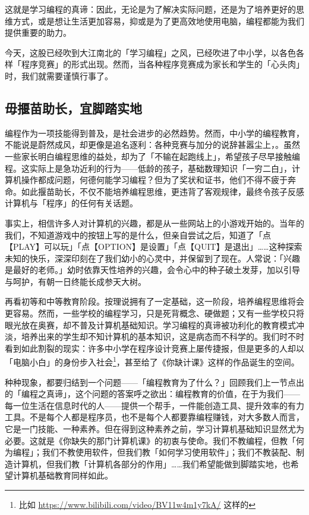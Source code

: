 这就是学习编程的真谛：因此，无论是为了解决实际问题，还是为了培养更好的思维方式，或是想让生活更加容易，抑或是为了更高效地使用电脑，编程都能为我们提供重要的助力。

今天，这股已经吹到大江南北的「学习编程」之风，已经吹进了中小学，以各色各样「程序竞赛」的形式出现。然而，当各种程序竞赛成为家长和学生的「心头肉」时，我们就需要谨慎行事了。

\subsection{毋揠苗助长，宜脚踏实地}

编程作为一项技能得到普及，是社会进步的必然趋势。然而，中小学的编程教育，不能说是蔚然成风，却更像是追名逐利：各种竞赛与加分的说辞甚嚣尘上，。虽然一些家长明白编程思维的益处，却为了「不输在起跑线上」，希望孩子尽早接触编程。这实际上是急功近利的行为——低龄的孩子，基础数理知识「一穷二白」，计算机操作都成问题，何德何能学习编程？但为了奖状和证书，他们不得不疲于奔命。如此揠苗助长，不仅不能培养编程思维，更违背了客观规律，最终令孩子反感计算机与「程序」的任何有关话题。

事实上，相信许多人对计算机的兴趣，都是从一些网站上的小游戏开始的。当年的我们，不知道游戏中的按钮上写的是什么，但亲自尝试之后，知道了「点【PLAY】可以玩」「点【OPTION】是设置」「点【QUIT】是退出」……这种探索未知的快乐，深深印刻在了我们幼小的心灵中，并保留到了现在。人常说：「兴趣是最好的老师。」幼时依靠天性培养的兴趣，会令心中的种子破土发芽，加以引导与呵护，有朝一日终能长成参天大树。

再看初等和中等教育阶段。按理说拥有了一定基础，这一阶段，培养编程思维将会更容易。然而，一些学校的编程学习，只是死背概念、硬做题；又有一些学校只将眼光放在奥赛，却不普及计算机基础知识。学习编程的真谛被功利化的教育模式冲淡，培养出来的学生却不知计算机的基本知识，这是病态而不科学的。我们时不时看到如此割裂的现实：许多中小学在程序设计竞赛上屡传捷报，但是更多的人却以「电脑小白」的身份步入社会\footnote{比如 \url{https://www.bilibili.com/video/BV11w4m1y7kA/} 这样的}，甚至给了《你缺计课》这样的作品诞生的空间。

种种现象，都要归结到一个问题——「编程教育为了什么？」回顾我们上一节点出的「编程之真谛」，这个问题的答案呼之欲出：编程教育的价值，在于为我们——每一位生活在信息时代的人——提供一个帮手，一件能创造工具、提升效率的有力工具。不是每个人都是程序员，也不是每个人都要靠编程赚钱，对大多数人而言，它是一门技能、一种素养。但在得到这种素养之前，学习计算机基础知识显然尤为必要。这就是《你缺失的那门计算机课》的初衷与使命。我们不教编程，但教「何为编程」；我们不教使用软件，但我们教「如何学习使用软件」；我们不教装配、制造计算机，但我们教「计算机各部分的作用」……我们希望能做到脚踏实地，也希望计算机基础教育同样如此。

